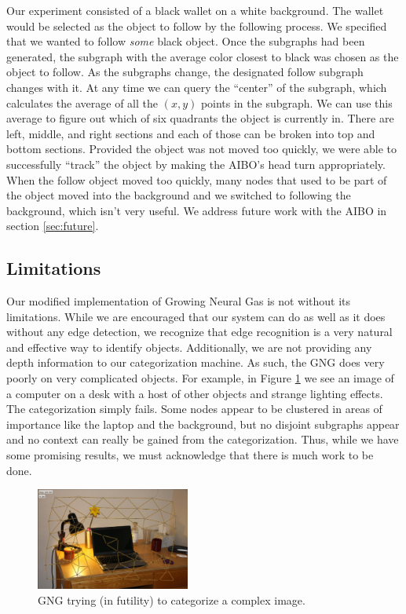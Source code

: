 \documentclass{article}
\renewcommand{\|}{\origbar} %
\begin{document}
Our experiment consisted of a black wallet on a white background. The wallet would be selected as the object to follow by the following process. We specified that we wanted to follow {\em some} black object. Once the subgraphs had been generated, the subgraph with the average color closest to black was chosen as the object to follow. As the subgraphs change, the designated follow subgraph changes with it. At any time we can query the ``center'' of the subgraph, which calculates the average of all the $(x,y)$ points in the subgraph. We can use this average to figure out which of six quadrants the object is currently in. There are left, middle, and right sections and each of those can be broken into top and bottom sections. Provided the object was not moved too quickly, we were able to successfully ``track'' the object by making the AIBO's head turn appropriately. When the follow object moved too quickly, many nodes that used to be part of the object moved into the background and we switched to following the background, which isn't very useful. We address future work with the AIBO in section \ref{sec:future}.

\subsection{Limitations}

Our modified implementation of Growing Neural Gas is not without its limitations. While we are encouraged that our system can do as well as it does without any edge detection, we recognize that edge recognition is a very natural and effective way to identify objects. Additionally, we are not providing any depth information to our categorization machine. As such, the GNG does very poorly on very complicated objects. For example, in Figure \ref{fig:badCategorization} we see an image of a computer on a desk with a host of other objects and strange lighting effects. The categorization simply fails. Some nodes appear to be clustered in areas of importance like the laptop and the background, but no disjoint subgraphs appear and no context can really be gained from the categorization. Thus, while we have some promising results, we must acknowledge that there is much work to be done.

\begin{figure}[h!]
  \centering
  
  \includegraphics[width=0.45\textwidth]{bad_categorization.png}
  
  \caption{GNG trying (in futility) to categorize a complex image.}
  \label{fig:badCategorization}
\end{figure}
\end{document}
